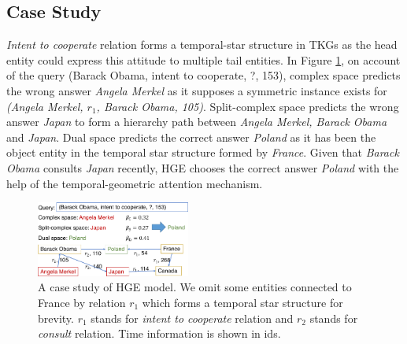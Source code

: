 \documentclass[letterpaper]{article} %
\begin{document}
\begin{table}[t!]
\centering
    \caption{
    MRR performance of HGE components. +tra stands for merely using temporal-relational attention mechanism. +tga stands for merely using temporal-geometric attention mechanism. +stack stands for integrating subspaces with the stacking strategy in \cite{han2020dyernie}
    }
    \label{table:ablation_tga}
\end{table}

\subsection{Case Study}
\textit{Intent to cooperate} relation forms a temporal-star structure in TKGs as the head entity could express this attitude to multiple tail entities. In Figure \ref{fig:case_study}, on account of the query (Barack Obama, intent to cooperate, ?, 153), complex space predicts the wrong answer \textit{Angela Merkel} as it supposes a symmetric instance exists for \textit{(Angela Merkel, $r_1$, Barack Obama, 105)}. Split-complex space predicts the wrong answer \textit{Japan} to form a hierarchy path between \textit{Angela Merkel, Barack Obama} and \textit{Japan}. Dual space predicts the correct answer \textit{Poland} as it has been the object entity in the temporal star structure formed by \textit{France}. Given that \textit{Barack Obama} consults \textit{Japan} recently, HGE chooses the correct answer \textit{Poland} with the help of the temporal-geometric attention mechanism.  

\begin{figure}[t]
    \centering
    \includegraphics[width=0.45\textwidth]{MetaE_case_study.pdf}
    \caption{A case study of HGE model. We omit some entities connected to France by relation $r_{1}$ which forms a temporal star structure for brevity. $r_{1}$ stands for \textit{intent to cooperate} relation and $r_{2}$ stands for \textit{consult} relation. Time information is shown in ids. 
    }
    \label{fig:case_study}
\end{figure}
\end{document}
